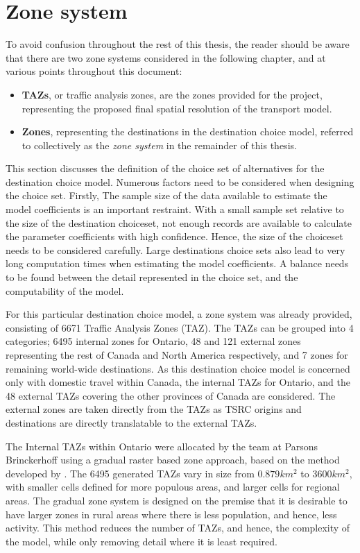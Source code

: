 \section{Zone system}
To avoid confusion throughout the rest of this thesis, the reader should be aware that there are two zone systems considered in the following chapter, and at various points throughout this document:
\begin{itemize}
\item \textbf{TAZs}, or traffic analysis zones, are the zones provided for the project, representing the proposed final spatial resolution of the transport model.
\item \textbf{Zones}, representing the destinations in the destination choice model, referred to collectively as the \textit{zone system} in the remainder of this thesis.  
\end{itemize}

This section discusses the definition of the choice set of alternatives for the destination choice model. Numerous factors need to be considered when designing the choice set. Firstly, The sample size of the data available to estimate the model coefficients is an important restraint. With a small sample set relative to the size of the destination choiceset, not enough records are available to calculate the parameter coefficients with high confidence. Hence, the size of the choiceset needs to be considered carefully. Large destinations choice sets also lead to very long computation times when estimating the model coefficients. A balance needs to be found between the detail represented in the choice set, and the computability of the model.

For this particular destination choice model, a zone system was already provided, consisting of 6671 Traffic Analysis Zones (TAZ). The TAZs can be grouped into 4 categories; 6495 internal zones for Ontario, 48 and 121 external zones representing the rest of Canada and North America respectively, and 7 zones for remaining world-wide destinations. As this destination choice model is concerned only with domestic travel within Canada, the internal TAZs for Ontario, and the 48 external TAZs covering the other provinces of Canada are considered. The external zones are taken directly from the TAZs as TSRC origins and destinations are directly translatable to the external TAZs.

The Internal TAZs within Ontario were allocated by the team at Parsons Brinckerhoff using a gradual raster based zone approach, based on the method developed by \textcite{moeckel2015gradual}. The 6495 generated TAZs vary in size from $0.879 km^2$ to $3600km^2$, with smaller cells defined for more populous areas, and larger cells for regional areas. The gradual zone system is designed on the premise that it is desirable to have larger zones in rural areas where there is less population, and hence, less activity. This method reduces the number of TAZs, and hence, the complexity of the model, while only removing detail where it is least required. 


